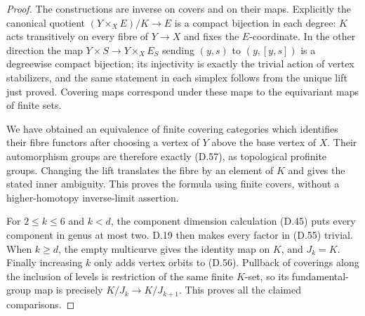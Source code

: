 \begin{proof}
The constructions are inverse on covers and
on their maps.  Explicitly the canonical
quotient $(Y\times_X E)/K\to E$ is a compact
bijection in each degree: $K$ acts transitively
on every fibre of $Y\to X$ and fixes the
$E$-coordinate.  In the other direction the
map $Y\times S\to Y\times_X E_S$ sending
$(y,s)$ to $(y,[y,s])$ is a degreewise
compact bijection; its injectivity is exactly
the trivial action of vertex stabilizers,
and the same statement in each simplex
follows from the unique lift just proved.
Covering maps correspond under these maps
to the equivariant maps of finite sets.

We have obtained an equivalence of finite
covering categories which identifies their
fibre functors after choosing a vertex of
$Y$ above the base vertex of $X$.  Their
automorphism groups are therefore exactly
(D.57), as topological profinite groups.
Changing the lift translates the fibre by
an element of $K$ and gives the stated inner
ambiguity.  This proves the formula using
finite covers, without a higher-homotopy
inverse-limit assertion.

For $2\leq k\leq6$ and $k<d$, the component
dimension calculation (D.45) puts every
component in genus at most two.  D.19 then
makes every factor in (D.55) trivial.  When
$k\geq d$, the empty multicurve gives the
identity map on $K$, and $J_k=K$.  Finally
increasing $k$ only adds vertex orbits to
(D.56).  Pullback of coverings along the
inclusion of levels is restriction of the
same finite $K$-set, so its fundamental-group
map is precisely $K/J_k\to K/J_{k+1}$.
This proves all the claimed comparisons.
\end{proof}
